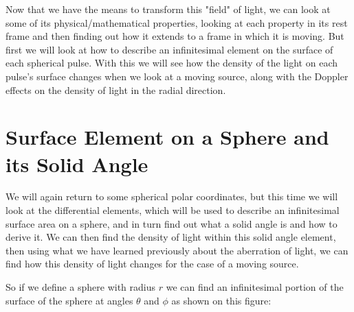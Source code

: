 Now that we have the means to transform this "field" of light, we can look at some of its physical/mathematical properties, looking at each property in its rest frame and then finding out how it extends to a frame in which it is moving.
But first we will look at how to describe an infinitesimal element on the surface of each spherical pulse.
With this we will see how the density of the light on each pulse's surface changes when we look at a moving source, along with the Doppler effects on the density of light in the radial direction.

\section{Surface Element on a Sphere and its Solid Angle} \label{subsect: Surface Element on a Sphere}

We will again return to some spherical polar coordinates, but this time we will look at the differential elements, which will be used to describe an infinitesimal surface area on a sphere, and in turn find out what a solid angle is and how to derive it.
We can then find the density of light within this solid angle element, then using what we have learned previously about the aberration of light, we can find how this density of light changes for the case of a moving source.

So if we define a sphere with radius $r$ we can find an infinitesimal portion of the surface of the sphere at angles ${\theta}$ and ${\phi}$ as shown on this figure:


